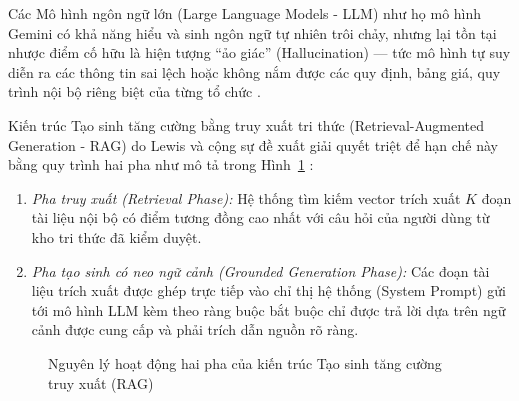 Các Mô hình ngôn ngữ lớn (Large Language Models - LLM) như họ mô hình Gemini có khả năng hiểu và sinh ngôn ngữ tự nhiên trôi chảy, nhưng lại tồn tại nhược điểm cố hữu là hiện tượng ``ảo giác'' (Hallucination) --- tức mô hình tự suy diễn ra các thông tin sai lệch hoặc không nắm được các quy định, bảng giá, quy trình nội bộ riêng biệt của từng tổ chức \cite{lewis2020rag}.

Kiến trúc Tạo sinh tăng cường bằng truy xuất tri thức (Retrieval-Augmented Generation - RAG) do Lewis và cộng sự đề xuất giải quyết triệt để hạn chế này bằng quy trình hai pha như mô tả trong Hình~\ref{fig:rag_concept} \cite{lewis2020rag}:
\begin{enumerate}
    \item \textit{Pha truy xuất (Retrieval Phase):} Hệ thống tìm kiếm vector trích xuất $K$ đoạn tài liệu nội bộ có điểm tương đồng cao nhất với câu hỏi của người dùng từ kho tri thức đã kiểm duyệt.
    \item \textit{Pha tạo sinh có neo ngữ cảnh (Grounded Generation Phase):} Các đoạn tài liệu trích xuất được ghép trực tiếp vào chỉ thị hệ thống (System Prompt) gửi tới mô hình LLM kèm theo ràng buộc bắt buộc chỉ được trả lời dựa trên ngữ cảnh được cung cấp và phải trích dẫn nguồn rõ ràng.
\end{enumerate}

\begin{figure}[H]
\centering
{}
\caption{Nguyên lý hoạt động hai pha của kiến trúc Tạo sinh tăng cường truy xuất (RAG)}
\label{fig:rag_concept}
\end{figure}

